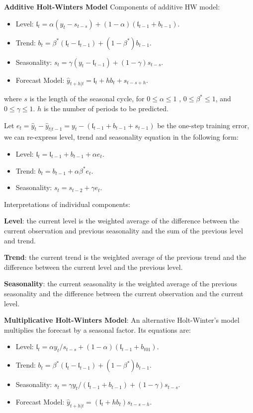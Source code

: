 \documentclass[
]{book}
\begin{document}
\textbf{Additive Holt-Winters Model} Components of additive HW model:

\begin{itemize}
\item
  Level: \(\mathfrak{l}_t = \alpha(y_t-s_{t-s})+(1-\alpha)(\mathfrak{l}_{t-1} + b_{t-1})\).
\item
  Trend: \(b_t=\beta^*(\mathfrak{l}_t-\mathfrak{l}_{t-1})+(1-\beta^*)b_{t-1}\).
\item
  Seasonality: \(s_t=\gamma(y_t-\mathfrak{l}_{t-1}) +(1-\gamma)s_{t-s}\).
\item
  Forecast Model: \(\hat{y}_{t+h|t} = \mathfrak{l}_t + hb_t + s_{t-s+h}\).
\end{itemize}

where \(s\) is the length of the seasonal cycle, for \(0 \le \alpha \le 1\) , \(0 \le \beta^* \le 1\), and \(0 \le \gamma \le 1\). \(h\) is the number of periods to be predicted.

Let \(e_t=\hat{y}_t - \hat{y}_{t|t-1} = y_t-(\mathfrak{l}_{t-1} + b_{t-1} + s_{t-1})\) be the one-step training error, we can re-express level, trend and seasonality equation in the following form:

\begin{itemize}
\item
  Level: \(\mathfrak{l}_t= \mathfrak{l}_{t-1} + b_{t-1} + \alpha e_t\).
\item
  Trend: \(b_t = b_{t-1} + \alpha \beta^* e_t\).
\item
  Seasonality: \(s_t = s_{t-2} + \gamma e_t\).
\end{itemize}

Interpretations of individual components:

\textbf{Level}: the current level is the weighted average of the difference between the current observation and previous seasonality and the sum of the previous level and trend.

\textbf{Trend}: the current trend is the weighted average of the previous trend and the difference between the current level and the previous level.

\textbf{Seasonality}: the current seasonality is the weighted average of the previous seasonality and the difference between the current observation and the current level.

\textbf{Multiplicative Holt-Winters Model}: An alternative Holt-Winter's model multiplies the forecast by a seasonal factor. Its equations are:

\begin{itemize}
\item
  Level: \(\mathfrak{l}_t=\alpha y_t/s_{t-s} + (1-\alpha)(\mathfrak{l}_{t-1}+b_{t01})\).
\item
  Trend: \(b_t = \beta^*(\mathfrak{l}_t - \mathfrak{l}_{t-1}) + (1-\beta^*)b_{t-1}\).
\item
  Seasonality: \(s_t = \gamma y_t/(\mathfrak{l}_{t-1}+b_{t-1}) + (1-\gamma)s_{t-s}\).
\item
  Forecast Model: \(\hat{y}_{t+h|t} = (\mathfrak{l}_t + h b_t)s_{t-s-h}\).
\end{itemize}
\end{document}
